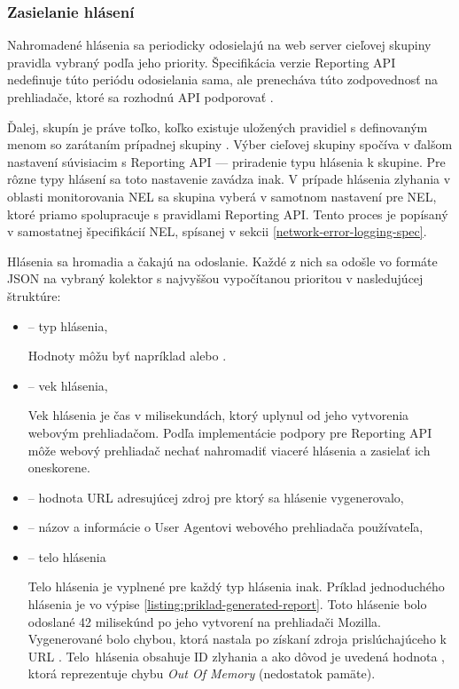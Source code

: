 \subsubsection{Zasielanie hlásení}

Nahromadené hlásenia sa periodicky odosielajú na web server cieľovej skupiny  pravidla vybraný podľa jeho priority.
Špecifikácia verzie  Reporting API nedefinuje túto periódu odosielania sama, ale prenecháva túto zodpovednosť na prehliadače, ktoré sa rozhodnú API podporovať \cite{W3C-reporting-api}.

\pagebreak

Ďalej, skupín  je práve toľko, koľko existuje uložených pravidiel s definovaným menom so zarátaním prípadnej skupiny .
Výber cieľovej skupiny spočíva v ďalšom nastavení súvisiacim s Reporting API --- priradenie typu hlásenia k skupine.
Pre rôzne typy hlásení sa toto nastavenie zavádza inak.
V prípade hlásenia zlyhania v oblasti monitorovania NEL sa skupina  vyberá v samotnom nastavení pre NEL, ktoré priamo spolupracuje s pravidlami Reporting API.
Tento proces je popísaný v samostatnej špecifikácií NEL, spísanej v sekcii \ref{network-error-logging-spec}.

Hlásenia sa hromadia a čakajú na odoslanie.
Každé z nich sa odošle vo formáte JSON na vybraný kolektor s najvyššou vypočítanou prioritou v nasledujúcej štruktúre:
\begin{itemize}
    \item {} -- typ hlásenia,

    Hodnoty môžu byť napríklad  alebo .
    
    \item {} -- vek hlásenia,

    Vek hlásenia je čas v milisekundách, ktorý uplynul od jeho vytvorenia webovým prehliadačom.
    Podľa implementácie podpory pre Reporting API môže webový prehliadač nechať nahromadiť viaceré hlásenia a zasielať ich oneskorene.
    
    \item {} -- hodnota URL adresujúcej zdroj pre ktorý sa hlásenie vygenerovalo,
    
    \item {} -- názov a informácie o User Agentovi webového prehliadača používateľa,
    
    \item {} -- telo hlásenia

    Telo hlásenia je vyplnené pre každý typ hlásenia inak. 
    Príklad jednoduchého hlásenia je vo výpise \ref{listing:priklad-generated-report}.
    Toto hlásenie bolo odoslané 42 milisekúnd po jeho vytvorení na prehliadači Mozilla. Vygenerované bolo chybou, ktorá nastala po získaní zdroja prislúchajúceho k URL . \mbox{Telo hlásenia} obsahuje ID zlyhania a ako dôvod je uvedená hodnota , ktorá reprezentuje chybu \textit{Out Of Memory} (nedostatok pamäte).
\end{itemize}


